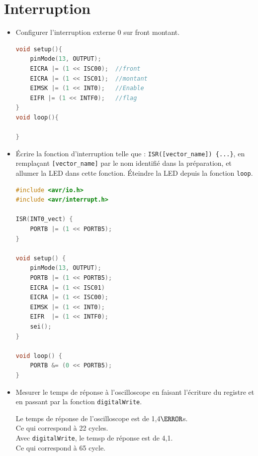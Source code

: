 \documentclass[a4paper,11pt]{article}
\begin{document}
\section{Interruption}

\begin{itemize}
    \item Configurer l'interruption externe 0 sur front montant.
    \begin{solution}
        \begin{lstlisting}[language=C++]
void setup(){
    pinMode(13, OUTPUT);
    EICRA |= (1 << ISC00);  //front
    EICRA |= (1 << ISC01);  //montant
    EIMSK |= (1 << INT0);   //Enable
    EIFR |= (1 << INTF0);   //flag
}
void loop(){

}    
        \end{lstlisting}
    \end{solution}

    \item Écrire la fonction d'interruption telle que : \texttt{ISR([vector\_name]) \{...\}}, en remplaçant \texttt{[vector\_name]} par le nom identifié dans la préparation, et allumer la LED dans cette fonction. Éteindre la LED depuis la fonction \texttt{loop}.
    \begin{solution}
        \begin{lstlisting}[language=C++]
#include <avr/io.h>
#include <avr/interrupt.h>

ISR(INT0_vect) {
    PORTB |= (1 << PORTB5); 
}

void setup() {
    pinMode(13, OUTPUT);
    PORTB |= (1 << PORTB5); 
    EICRA |= (1 << ISC01) 
    EICRA |= (1 << ISC00);
    EIMSK |= (1 << INT0); 
    EIFR  |= (1 << INTF0);
    sei();
}

void loop() {
    PORTB &= (0 << PORTB5); 
}
        \end{lstlisting}
    \end{solution}

    \item Mesurer le temps de réponse à l'oscilloscope en faisant l'écriture du registre et en passant par la fonction \texttt{digitalWrite}.
    \begin{solution}
        Le temps de réponse de l'oscilloscope est de 1,4$\micro$s.\\
        Ce qui correspond à 22 cycles.\\
        Avec \texttt{digitalWrite}, le temsp de réponse est de 4,1.\\
        Ce qui correspond à 65 cycle.
    \end{solution}


\end{itemize}
\end{document}
